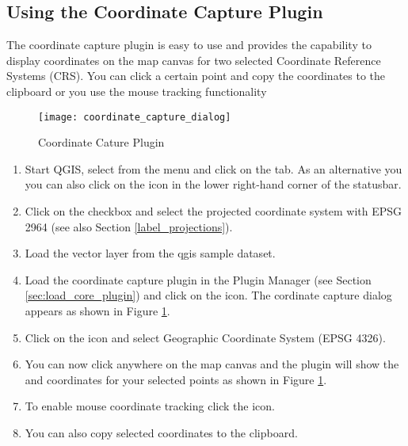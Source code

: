 \subsection{Using the Coordinate Capture Plugin}


The coordinate capture plugin is easy to use and provides the 
capability to display coordinates on the map canvas for two 
selected Coordinate Reference Systems (CRS). You can click a 
certain point and copy the coordinates to the clipboard or you 
use the mouse tracking functionality 

\begin{figure}[ht]
   \begin{center}
   \caption{Coordinate Cature Plugin \nixcaption}\label{fig:coordinate_capture_dialog}\smallskip
   \texttt{[image: coordinate\_capture\_dialog]}
\end{center}  
\end{figure}

\begin{enumerate}
  \item Start QGIS, select  from 
  the  menu and click on the  tab. As an alternative you 
  you can also click on the  icon in the lower 
  right-hand corner of the statusbar.
  \item Click on the  checkbox and select the projected 
  coordinate system  with EPSG 2964 (see also 
  Section \ref{label_projections}).
  \item Load the  vector layer from the qgis sample dataset.
  \item Load the coordinate capture plugin in the Plugin Manager (see Section 
  \ref{sec:load_core_plugin}) and click on the  
  icon. The cordinate capture dialog appears as shown in Figure \ref{fig:coordinate_capture_dialog}.
  \item Click on the  
  icon and select Geographic Coordinate System  (EPSG 4326).
  \item You can now click anywhere on the map canvas and the plugin will show the 
   and  coordinates for your selected points as shown in 
  Figure \ref{fig:coordinate_capture_dialog}.
  \item To enable mouse coordinate tracking click the  icon.
  \item You can also copy selected coordinates to the clipboard.
\end{enumerate}

\newpage



